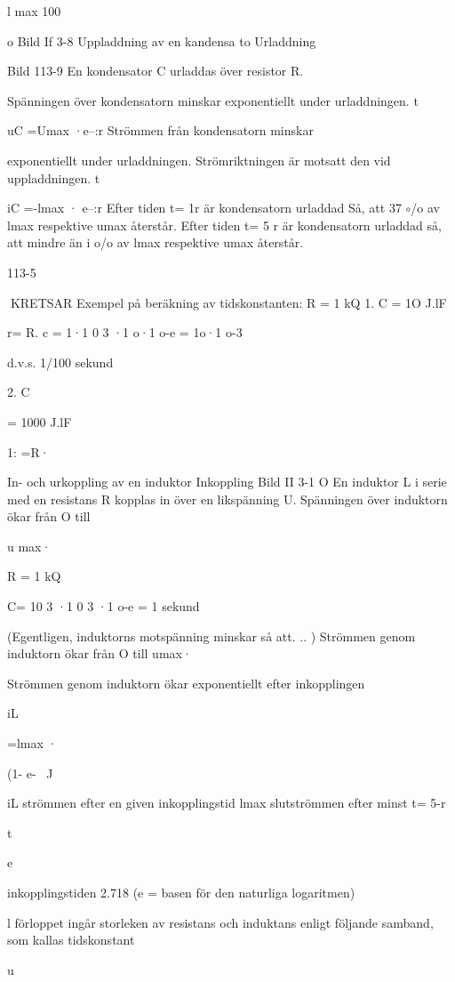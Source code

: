 l max
100%

o
Bild If 3-8 Uppladdning av en kandensa to
Urladdning

Bild 113-9
En kondensator C urladdas över resistor R.

Spänningen över kondensatorn minskar
exponentiellt under urladdningen.
t

uC =Umax ·e--:r
Strömmen från kondensatorn minskar

exponentiellt under urladdningen. Strömriktningen är motsatt den vid uppladdningen.
t

iC =-lmax · e--:r
Efter tiden t= 1r är kondensatorn urladdad Så, att 37 \(\circ\)/o av lmax respektive umax
återstår.
Efter tiden t= 5 r är kondensatorn urladdad så, att mindre än i o/o av lmax respektive
umax återstår.

113-5

KRETSAR
Exempel på beräkning av tidskonstanten:
R = 1 kQ
1. C = 1O J.lF

r= R. c = 1·1 0 3 ·1 o·1 o-e = 1o·1 o-3

d.v.s. 1/100 sekund

2. C

= 1000 J.lF

1: =R·

In- och urkoppling av en induktor
Inkoppling
Bild II 3-1 O
En induktor L i serie med en resistans R
kopplas in över en likspänning U.
Spänningen över induktorn ökar från O till

u max·

R = 1 kQ

C= 10 3 ·1 0 3 ·1 o-e = 1 sekund

(Egentligen, induktorns motspänning
minskar så att. .. )
Strömmen genom induktorn ökar från O
till umax·

Strömmen genom induktorn ökar exponentiellt efter inkopplingen

iL

=lmax ·

(1- e-~ J

iL strömmen efter en given inkopplingstid
lmax slutströmmen efter minst t= 5-r

t

e

inkopplingstiden
2.718 (e = basen för den naturliga
logaritmen)

l förloppet ingår storleken av resistans
och induktans enligt följande samband, som
kallas tidskonstant

u

